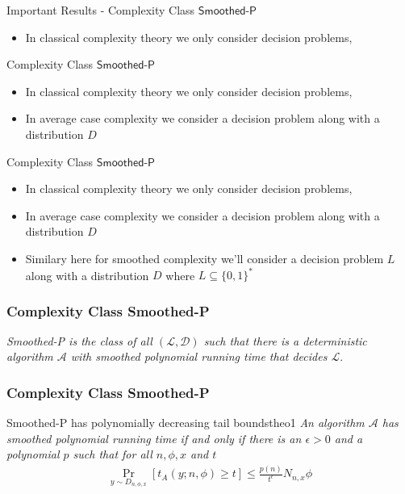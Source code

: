 \begin{frame}{Important Results - Complexity Class $\textsf{Smoothed-P}$}
    \begin{itemize}
        \item In classical complexity theory we only consider decision problems,
    \end{itemize}
\end{frame}

\begin{frame}{Complexity Class $\textsf{Smoothed-P}$}
    \begin{itemize}
        \item In classical complexity theory we only consider decision problems,
        \item In average case complexity we consider a decision problem along with a
              distribution $D$
    \end{itemize}
\end{frame}

\begin{frame}{Complexity Class $\textsf{Smoothed-P}$}
    \begin{itemize}
        \item In classical complexity theory we only consider decision problems,
        \item In average case complexity we consider a decision problem along with a
              distribution $D$
        \item Similary here for smoothed complexity we'll consider a decision problem $L$
              along with a distribution $D$ where $L \subseteq \{0,1\}^{*}$
    \end{itemize}
\end{frame}

\begin{frame}
    \frametitle{Complexity Class \textsf{Smoothed-P}}

    \begin{center}
        \textit{\textsf{Smoothed-P} is the class of all $ (\mathcal{L}, \mathcal{D})$ such that there is a
            deterministic algorithm $\mathcal{A}$ with smoothed polynomial running time that decides $\mathcal{L}$}.
    \end{center}

\end{frame}

\begin{frame}
    \frametitle{Complexity Class \textsf{Smoothed-P}}

    \begin{theo}{\textsf{Smoothed-P} has polynomially decreasing tail bounds}{theo1}
        \textit{An algorithm $\mathcal{A}$ has smoothed polynomial running time if and only if
            there is an $\epsilon > 0$ and a polynomial $p$ such that for all $n, \phi, x$ and $t$}
        \begin{align*}
            \Pr_{y \sim D_{n, \phi, x}}[t_A(y;n, \phi) \geq t] \leq \frac{p(n)}{t^{\epsilon}} N_{n,x} \phi
        \end{align*}
    \end{theo}

\end{frame}

